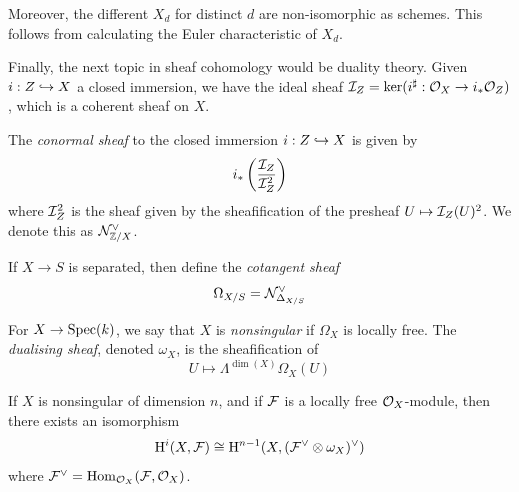 \documentclass{article}
\begin{document}
Moreover, the different \(X_d\) for distinct \(d\) are non-isomorphic as schemes. This follows from calculating the Euler characteristic of \(X_d\).

Finally, the next topic in sheaf cohomology would be duality theory. Given \(i : Z \hookrightarrow X\) a closed immersion, we have the ideal sheaf \(\mathcal{I}_Z = \ker(i^\sharp : \mathcal{O}_X \to i_*\mathcal{O}_Z)\), which is a coherent sheaf on \(X\).

\begin{definition}
    The \emph{conormal sheaf} to the closed immersion \(i : Z \hookrightarrow X\) is given by
    \[i_*\left(\frac{\mathcal{I}_Z}{\mathcal{I}_Z^2}\right)\]
    where \(\mathcal{I}_Z^2\) is the sheaf given by the sheafification of the presheaf \(U \mapsto \mathcal{I}_Z(U)^2\). We denote this as \(\mathcal{N}^\vee_{\mathbb{Z}/X}\). 
\end{definition}

\begin{definition}
    If \(X \to S\) is separated, then define the \emph{cotangent sheaf}
    \[\Omega_{X/S} = \mathcal{N}^\vee_{\Delta_{X/S}}\]
\end{definition}

For \(X \to \operatorname{Spec}(k)\), we say that \(X\) is \emph{nonsingular} if \(\Omega_X\) is locally free. The \emph{dualising sheaf}, denoted \(\omega_X\), is the sheafification of
\[U \mapsto \Lambda^{\dim(X)}\Omega_X(U)\]

\begin{theorem}
     If \(X\) is nonsingular of dimension \(n\), and if \(\mathcal{F}\) is a locally free \(\mathcal{O}_X\)-module, then there exists an isomorphism
    \[\mathrm{H}^i(X, \mathcal{F}) \cong \mathrm{H}^{n-1}(X, (\mathcal{F}^\vee \otimes \omega_X)^\vee)\]
    where \(\mathcal{F}^\vee = \operatorname{Hom}_{\mathcal{O}_X}(\mathcal{F}, \mathcal{O}_X)\).
\end{theorem}

\printindex
\end{document}
